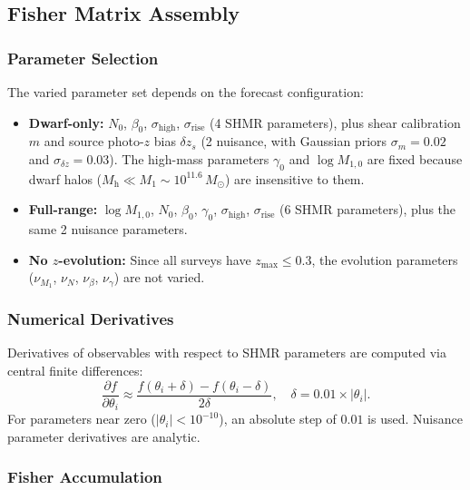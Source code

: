 \documentclass[12pt, letterpaper]{article}
\newcommand{\Msun}{M_\odot}
\newcommand{\Mh}{M_\mathrm{h}}
\begin{document}
\subsection{Fisher Matrix Assembly}

\subsubsection{Parameter Selection}

The varied parameter set depends on the forecast configuration:
\begin{itemize}
    \item \textbf{Dwarf-only:} $N_0$, $\beta_0$,
    $\sigma_\mathrm{high}$, $\sigma_\mathrm{rise}$ (4 SHMR
    parameters), plus shear calibration $m$ and source photo-$z$ bias
    $\delta z_s$ (2 nuisance, with Gaussian priors $\sigma_m = 0.02$
    and $\sigma_{\delta z} = 0.03$). The high-mass parameters
    $\gamma_0$ and $\log M_{1,0}$ are fixed because dwarf halos
    ($\Mh \ll M_1 \sim 10^{11.6}\,\Msun$) are insensitive to them.

    \item \textbf{Full-range:} $\log M_{1,0}$, $N_0$, $\beta_0$,
    $\gamma_0$, $\sigma_\mathrm{high}$, $\sigma_\mathrm{rise}$
    (6 SHMR parameters), plus the same 2 nuisance parameters.

    \item \textbf{No $z$-evolution:} Since all surveys have
    $z_\mathrm{max} \le 0.3$, the evolution parameters
    ($\nu_{M_1}$, $\nu_N$, $\nu_\beta$, $\nu_\gamma$) are not varied.
\end{itemize}


\subsubsection{Numerical Derivatives}

Derivatives of observables with respect to SHMR parameters are
computed via central finite differences:
\begin{equation}
\frac{\partial f}{\partial \theta_i} \approx
    \frac{f(\theta_i + \delta) - f(\theta_i - \delta)}{2\delta},
\quad
\delta = 0.01 \times |\theta_i|.
\end{equation}
For parameters near zero ($|\theta_i| < 10^{-10}$), an absolute step
of $0.01$ is used.
Nuisance parameter derivatives are analytic.


\subsubsection{Fisher Accumulation}
\end{document}
